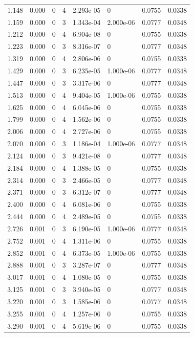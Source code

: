 \documentclass[preview]{standalone}
\begin{document}
{{\begin{tabular}{L{1.2cm}C{1.2cm} C{0.3cm}C{0.5cm} C{1.4cm}C{1.4cm} C{1.4cm}C{1.4cm}}
  1.148  &  0.000  & 0     &  4 &  2.293e-05  & 0  & 0.0755 &  0.0338   \\ 
  1.159  &  0.000  & 0     &  3 &  1.343e-04  & 2.000e-06  & 0.0777 &  0.0348   \\ 
  1.212  &  0.000  & 0     &  4 &  6.904e-08  & 0  & 0.0755 &  0.0338   \\ 
  1.223  &  0.000  & 0     &  3 &  8.316e-07  & 0  & 0.0777 &  0.0348   \\ 
  1.319  &  0.000  & 0     &  4 &  2.806e-06  & 0  & 0.0755 &  0.0338   \\ 
  1.429  &  0.000  & 0     &  3 &  6.235e-05  & 1.000e-06  & 0.0777 &  0.0348   \\ 
  1.447  &  0.000  & 0     &  3 &  3.317e-06  & 0  & 0.0777 &  0.0348   \\ 
  1.513  &  0.000  & 0     &  4 &  9.404e-05  & 1.000e-06  & 0.0755 &  0.0338   \\ 
  1.625  &  0.000  & 0     &  4 &  6.045e-06  & 0  & 0.0755 &  0.0338   \\ 
  1.799  &  0.000  & 0     &  4 &  1.562e-06  & 0  & 0.0755 &  0.0338   \\ 
  2.006  &  0.000  & 0     &  4 &  2.727e-06  & 0  & 0.0755 &  0.0338   \\ 
  2.070  &  0.000  & 0     &  3 &  1.186e-04  & 1.000e-06  & 0.0777 &  0.0348   \\ 
  2.124  &  0.000  & 0     &  3 &  9.421e-08  & 0  & 0.0777 &  0.0348   \\ 
  2.184  &  0.000  & 0     &  4 &  1.388e-05  & 0  & 0.0755 &  0.0338   \\ 
  2.314  &  0.000  & 0     &  3 &  2.466e-05  & 0  & 0.0777 &  0.0348   \\ 
  2.371  &  0.000  & 0     &  3 &  6.312e-07  & 0  & 0.0777 &  0.0348   \\ 
  2.400  &  0.000  & 0     &  4 &  6.081e-06  & 0  & 0.0755 &  0.0338   \\ 
  2.444  &  0.000  & 0     &  4 &  2.489e-05  & 0  & 0.0755 &  0.0338   \\ 
  2.726  &  0.001  & 0     &  3 &  6.190e-05  & 1.000e-06  & 0.0777 &  0.0348   \\ 
  2.752  &  0.001  & 0     &  4 &  1.311e-06  & 0  & 0.0755 &  0.0338   \\ 
  2.852  &  0.001  & 0     &  4 &  6.373e-05  & 1.000e-06  & 0.0755 &  0.0338   \\ 
  2.888  &  0.001  & 0     &  3 &  3.287e-07  & 0  & 0.0777 &  0.0348   \\ 
  3.017  &  0.001  & 0     &  4 &  1.080e-05  & 0  & 0.0755 &  0.0338   \\ 
  3.125  &  0.001  & 0     &  3 &  3.940e-05  & 0  & 0.0777 &  0.0348   \\ 
  3.220  &  0.001  & 0     &  3 &  1.585e-06  & 0  & 0.0777 &  0.0348   \\ 
  3.255  &  0.001  & 0     &  4 &  1.257e-06  & 0  & 0.0755 &  0.0338   \\ 
  3.290  &  0.001  & 0     &  4 &  5.619e-06  & 0  & 0.0755 &  0.0338   \\ 
\hline 
\end{tabular} 

}}
\end{document}
